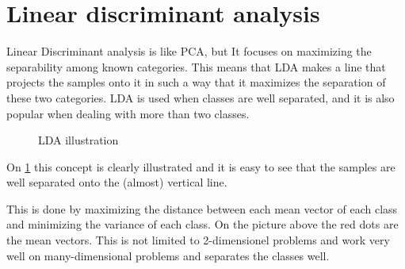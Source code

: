 \section{Linear discriminant analysis}

Linear Discriminant analysis is like PCA, but It focuses on maximizing the separability among known categories. This means that LDA makes a line that projects the samples onto it in such a way that it maximizes the separation of these two categories. LDA is used when classes are well separated, and it is also popular when dealing with more than two classes.

\begin{figure}[H]
	\centering
	\caption{LDA illustration}
	\label{fig:LDA_illustration}
\end{figure}

On \cref{fig:LDA_illustration} this concept is clearly illustrated and it is easy to see that the samples are well separated onto the (almost) vertical line.

This is done by maximizing the distance between each mean vector of each class and minimizing the variance of each class. On the picture above the red dots are the mean vectors. This is not limited to 2-dimensionel problems and work very well on many-dimensional problems and separates the classes well.